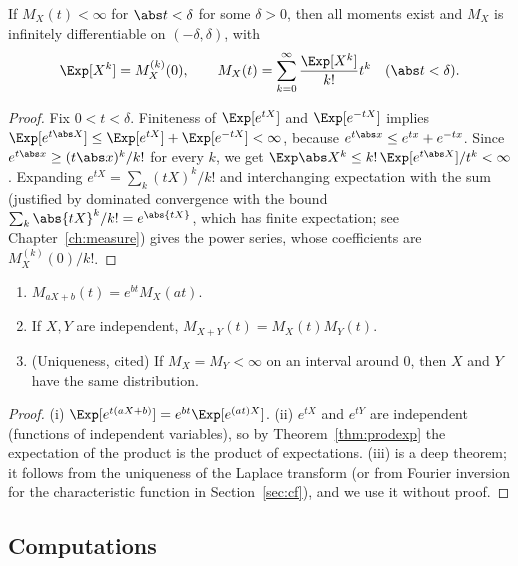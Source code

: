 \begin{theorem}\label{thm:mgfmoments}
If $M_X(t)<\infty$ for $\abs t<\delta$ for some $\delta>0$, then all moments exist and
$M_X$ is infinitely differentiable on $(-\delta,\delta)$, with
\[
\Exp[X^k]=M_X^{(k)}(0),\qquad
M_X(t)=\sum_{k=0}^\infty\frac{\Exp[X^k]}{k!}t^k\quad(\abs t<\delta).
\]
\end{theorem}
\begin{proof}
Fix $0<t<\delta$. Finiteness of $\Exp[e^{tX}]$ and $\Exp[e^{-tX}]$ implies
$\Exp[e^{t\abs X}]\le\Exp[e^{tX}]+\Exp[e^{-tX}]<\infty$, because
$e^{t\abs x}\le e^{tx}+e^{-tx}$. Since $e^{t\abs x}\ge(t\abs x)^k/k!$ for every $k$,
we get $\Exp\abs X^k\le k!\,\Exp[e^{t\abs X}]/t^k<\infty$.
Expanding $e^{tX}=\sum_k(tX)^k/k!$ and interchanging expectation with the sum (justified
by dominated convergence with the bound $\sum_k\abs{tX}^k/k!=e^{\abs{tX}}$, which has
finite expectation; see Chapter~\ref{ch:measure}) gives the power series, whose
coefficients are $M_X^{(k)}(0)/k!$.
\end{proof}

\begin{theorem}[Properties]\label{thm:mgfprops}
\begin{enumerate}[label=(\roman*)]
\item $M_{aX+b}(t)=e^{bt}M_X(at)$.
\item If $X,Y$ are independent, $M_{X+Y}(t)=M_X(t)M_Y(t)$.
\item (Uniqueness, cited) If $M_X=M_Y<\infty$ on an interval around $0$, then $X$ and
$Y$ have the same distribution.
\end{enumerate}
\end{theorem}
\begin{proof}
(i) $\Exp[e^{t(aX+b)}]=e^{bt}\Exp[e^{(at)X}]$. (ii) $e^{tX}$ and $e^{tY}$ are
independent (functions of independent variables), so by
Theorem~\ref{thm:prodexp} the expectation of the product is the product of
expectations. (iii) is a deep theorem; it follows from the uniqueness of the
Laplace transform (or from Fourier inversion for the characteristic function in
Section~\ref{sec:cf}), and we use it without proof.
\end{proof}

\subsection*{Computations}


